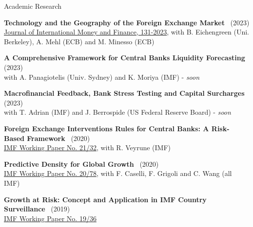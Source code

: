 \documentclass[usegeometry, 10pt, a4paper]{cv} %
\newcommand{\activite}[1]{\textbf{#1}\ }
\begin{document}
\begin{rubriquetableau}[0.95\textwidth]{Academic Research}\\
  \vspace{-0.5cm}

\activite{Technology and the Geography of the Foreign Exchange Market} (2023)\\
\hspace{0.6cm} \small{\href{https://www.sciencedirect.com/science/article/abs/pii/S0261560623000037}{Journal of International Money and Finance, 131-2023}, with B. Eichengreen (Uni. Berkeley), A. Mehl (ECB) and M. Minesso (ECB)}
\vspace{0.4cm} 

\activite{A Comprehensive Framework for Central Banks Liquidity Forecasting} (2023) \\
\hspace{0.6cm} \small{with A. Panagiotelis (Univ. Sydney) and K. Moriya (IMF) - \emph{soon}}
\vspace{0.4cm} 
  
\activite{Macrofinancial Feedback, Bank Stress Testing and Capital Surcharges} (2023) \\
\hspace{0.6cm} \small{with T. Adrian (IMF) and J. Berrospide (US Federal
  Reserve Board) - \emph{soon}}
\vspace{0.4cm} 
  
\activite{Foreign Exchange Interventions Rules for Central Banks: A Risk-Based Framework} (2020) \\
\hspace{0.6cm} \small{\href{https://www.imf.org/en/Publications/WP/Issues/2021/02/12/Foreign-Exchange-Intervention-Rules-for-Central-Banks-A-Risk-based-Framework-50081}{IMF Working Paper No. 21/32}, with R. Veyrune (IMF)}
\vspace{0.4cm} 
  

\activite{Predictive Density for Global Growth} (2020) \\
\hspace{0.6cm} \small{\href{https://www.imf.org/en/Publications/WP/Issues/2020/05/29/Predictive-Density-Aggregation-A-Model-for-Global-GDP-Growth-49441}{IMF Working Paper No. 20/78}, with F. Caselli, F. Grigoli and C. Wang (all IMF)}
\vspace{0.4cm} 

  
\activite{Growth at Risk: Concept and Application in IMF Country Surveillance} (2019) \\
\hspace{0.6cm} \small{\href{https://www.imf.org/en/Publications/WP/Issues/2019/02/21/Growth-at-Risk-Concept-and-Application-in-IMF-Country-Surveillance-46567}{IMF Working Paper No. 19/36}}
\vspace{0.4cm} 


\end{rubriquetableau}
\end{document}
